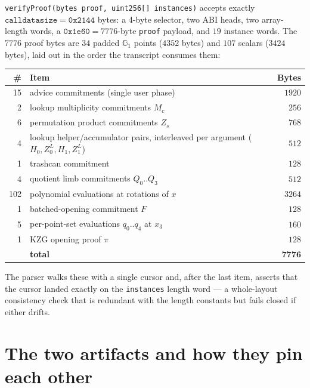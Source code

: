 \documentclass[11pt,a4paper]{article}
\newcommand{\Gone}{\ensuremath{\mathbb{G}_{1}}}
\newcommand{\code}[1]{\texttt{#1}}
\theoremstyle{definition}
\begin{document}
\code{verifyProof(bytes proof, uint256[] instances)} accepts exactly
$\code{calldatasize} = \mathtt{0x2144}$ bytes: a 4-byte selector, two ABI
heads, two array-length words, a $\mathtt{0x1e60}=7776$-byte \code{proof}
payload, and $19$ instance words. The $7776$ proof bytes are $34$ padded $\Gone$ points ($4352$ bytes)
and $107$ scalars ($3424$ bytes), laid out in the order the transcript
consumes them:

\begin{center}
\begin{tabular}{@{}rlr@{}}
\toprule
\# & Item & Bytes \\
\midrule
15 & advice commitments (single user phase) & $1920$ \\
 2 & lookup multiplicity commitments $M_c$  & $256$ \\
 6 & permutation product commitments $Z_s$  & $768$ \\
 4 & lookup helper/accumulator pairs, interleaved per argument ($H_0, Z^{L}_0, H_1, Z^{L}_1$) & $512$ \\
 1 & trashcan commitment                    & $128$ \\
 4 & quotient limb commitments $Q_0..Q_3$   & $512$ \\
102 & polynomial evaluations at rotations of $x$ & $3264$ \\
 1 & batched-opening commitment $F$          & $128$ \\
 5 & per-point-set evaluations $q_0..q_4$ at $x_3$ & $160$ \\
 1 & KZG opening proof $\pi$                 & $128$ \\
\midrule
   & \textbf{total}                          & $\mathbf{7776}$ \\
\bottomrule
\end{tabular}
\end{center}

\noindent
The parser walks these with a single cursor and, after the last item, asserts
that the cursor landed exactly on the \code{instances} length word --- a
whole-layout consistency check that is redundant with the length constants but
fails closed if either drifts.

\section{The two artifacts and how they pin each other}
\label{sec:artifacts}
\end{document}
